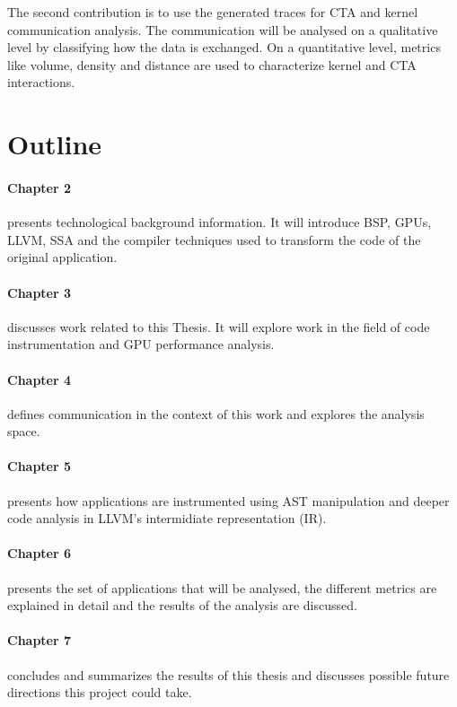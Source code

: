 The second contribution is to use the generated traces for CTA and kernel communication analysis. The communication will be analysed on a qualitative level by classifying how the data is exchanged. On a quantitative level, metrics like volume, density and distance are used to characterize kernel and CTA interactions.


\section{Outline}
	\paragraph{Chapter 2} presents technological background information. It will introduce BSP, GPUs, LLVM, SSA and the compiler techniques used to transform the code of the original application.
	\paragraph{Chapter 3} discusses work related to this Thesis. It will explore work in the field of code instrumentation and GPU performance analysis.
	\paragraph{Chapter 4} defines communication in the context of this work and explores the analysis space.
	\paragraph{Chapter 5} presents how applications are instrumented using AST manipulation and deeper code analysis in LLVM's intermidiate representation (IR).
	\paragraph{Chapter 6} presents the set of applications that will be analysed, the different metrics are explained in detail and the results of the analysis are discussed.
	\paragraph{Chapter 7} concludes and summarizes the results of this thesis and discusses possible future directions this project could take.
